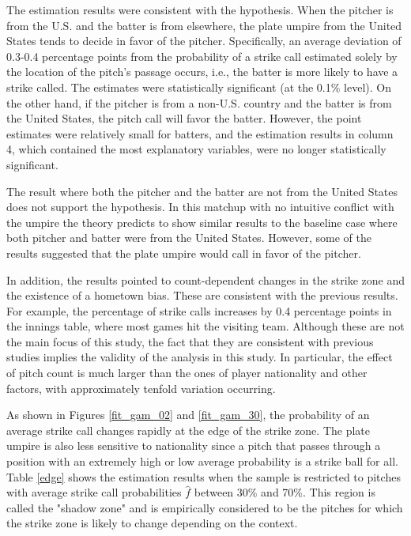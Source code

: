 \documentclass[dvipdfmx, 12pt]{jsarticle}
\begin{document}


The estimation results were consistent with the hypothesis. When the pitcher is from the U.S. and the batter is from elsewhere, the plate umpire from the United States tends to decide in favor of the pitcher. Specifically, an average deviation of 0.3-0.4 percentage points from the probability of a strike call estimated solely by the location of the pitch's passage occurs, i.e., the batter is more likely to have a strike called. The estimates were statistically significant (at the 0.1\% level). On the other hand, if the pitcher is from a non-U.S. country and the batter is from the United States, the pitch call will favor the batter. However, the point estimates were relatively small for batters, and the estimation results in column 4, which contained the most explanatory variables, were no longer statistically significant.

The result where both the pitcher and the batter are not from the United States does not support the hypothesis. In this matchup with no intuitive conflict with the umpire the theory predicts to show similar results to the baseline case where both pitcher and batter were from the United States. However, some of the results suggested that the plate umpire would call in favor of the pitcher.

In addition, the results pointed to count-dependent changes in the strike zone and the existence of a hometown bias. These are consistent with the previous results. For example, the percentage of strike calls increases by 0.4 percentage points in the innings table, where most games hit the visiting team. Although these are not the main focus of this study, the fact that they are consistent with previous studies implies the validity of the analysis in this study. In particular, the effect of pitch count is much larger than the ones of player nationality and other factors, with approximately tenfold variation occurring.



As shown in Figures \ref{fit_gam_02} and \ref{fit_gam_30}, the probability of an average strike call changes rapidly at the edge of the strike zone. The plate umpire is also less sensitive to nationality since a pitch that passes through a position with an extremely high or low average probability is a strike ball for all. Table \ref{edge} shows the estimation results when the sample is restricted to pitches with average strike call probabilities $\hat{f}$ between 30\% and 70\%. This region is called the "shadow zone" and is empirically considered to be the pitches for which the strike zone is likely to change depending on the context.
\end{document}
